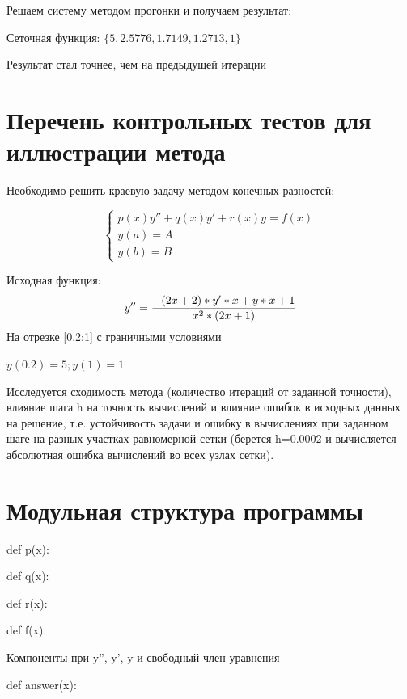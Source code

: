 Решаем систему методом прогонки и получаем результат: 

Сеточная функция:
\begin{math}
	\{5, 2.5776, 1.7149, 1.2713, 1\}
\end{math}

Результат стал точнее, чем на предыдущей итерации

\section{Перечень контрольных тестов для иллюстрации метода}

  Необходимо решить краевую задачу методом конечных разностей:
 
\begin{equation}
	\begin{cases}
		p(x)y''+q(x)y'+r(x)y=f(x) \\
		y(a)= A \\
		y(b) = B 	
	\end{cases}
\end{equation}

 
 Исходная функция: 
\begin{equation}
	y''=\frac{-(2x+2)*y'*x+y*x+1}{x^{2}*(2x+1)}\\
\end{equation}
 На отрезке [0.2;1] с граничными условиями
 
 \begin{math}
 	y(0.2)= 5 ;
 	y(1) = 1 
 \end{math}
 
 
 Исследуется сходимость метода (количество итераций от заданной точности), влияние шага h на точность вычислений и влияние ошибок в исходных данных на решение, т.е. устойчивость задачи и ошибку в вычислениях при заданном шаге на разных участках равномерной сетки (берется h=0.0002 и вычисляется абсолютная ошибка вычислений во всех узлах сетки).

\section{Модульная структура программы}

def p(x):

def q(x):

def r(x):

def f(x):

Компоненты при y'', y', y и свободный член уравнения

def answer(x):

